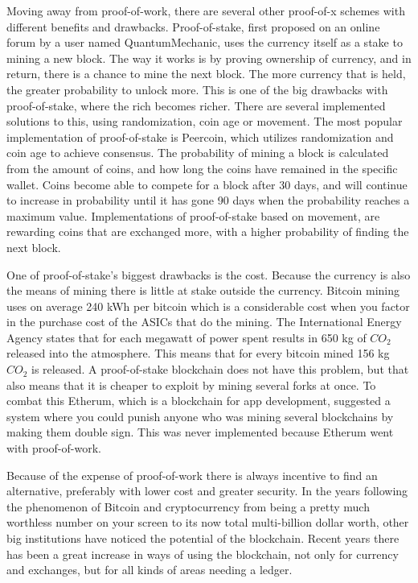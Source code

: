 \documentclass[12pt]{article}
\begin{document}
Moving away from proof-of-work, there are several other proof-of-x schemes with different benefits and drawbacks. Proof-of-stake, first proposed on an online forum by a user named QuantumMechanic, uses the currency itself as a stake to mining a new block\cite{proofofstake}. The way it works is by proving ownership of currency, and in return, there is a chance to mine the next block. The more currency that is held, the greater probability to unlock more. This is one of the big drawbacks with proof-of-stake, where the rich becomes richer. There are several implemented solutions to this, using randomization, coin age or movement. The most popular implementation of proof-of-stake is Peercoin, which utilizes randomization and coin age to achieve consensus\cite{croteau2014proof}. The probability of mining a block is calculated from the amount of coins, and how long the coins have remained in the specific wallet. Coins become able to compete for a block after 30 days, and will continue to increase in probability until it has gone 90 days when the probability reaches a maximum value. Implementations of proof-of-stake based on movement, are rewarding coins that are exchanged more, with a higher probability of finding the next block. 

One of proof-of-stake's biggest drawbacks is the cost. Because the currency is also the means of mining there is little at stake outside the currency. Bitcoin mining uses on average 240 kWh per bitcoin which is a considerable cost when you factor in the purchase cost of the ASICs that do the mining. The International Energy Agency states that for each megawatt of power spent results in 650 kg of $CO_2$ released into the atmosphere. This means that for every bitcoin mined 156 kg $CO_2$ is released. A proof-of-stake blockchain does not have this problem, but that also means that it is cheaper to exploit by mining several forks at once. To combat this Etherum, which is a blockchain for app development, suggested a system where you could punish anyone who was mining several blockchains by making them double sign. This was never implemented because Etherum went with proof-of-work. 

Because of the expense of proof-of-work there is always incentive to find an alternative, preferably with lower cost and greater security. In the years following the phenomenon of Bitcoin and cryptocurrency from being a pretty much worthless number on your screen to its now total multi-billion dollar worth, other big institutions have noticed the potential of the blockchain. Recent years there has been a great increase in ways of using the blockchain, not only for currency and exchanges, but for all kinds of areas needing a ledger.
\end{document}
